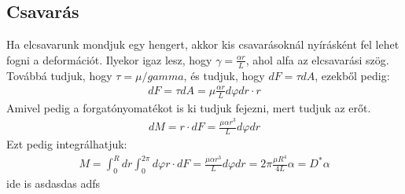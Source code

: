 \documentclass{article}
\begin{document}
\subsection{Csavarás}
Ha elcsavarunk mondjuk egy hengert, akkor kis csavarásoknál nyírásként fel lehet fogni a deformációt. Ilyekor igaz lesz, hogy $\gamma = \frac{\alpha r}{L}$, ahol alfa az elcsavarási szög. Továbbá tudjuk, hogy $\tau = \mu / gamma$, és tudjuk, hogy $dF = \tau dA$, ezekből pedig:
\begin{align*}
dF = \tau dA = \mu \frac{\alpha r}{L} d\varphi dr \cdot r
\end{align*}
Amivel pedig a forgatónyomatékot is ki tudjuk fejezni, mert tudjuk az erőt.
\begin{align*}
dM = r \cdot dF = \frac{\mu \alpha r^3}{L }d\varphi dr
\end{align*}
Ezt pedig integrálhatjuk:
\begin{align*}
M=\int_0^R dr \int_0^{2\pi} d\varphi r \cdot dF = \frac{\mu \alpha r^3}{L }d\varphi dr = 2\pi \frac{\mu R^4}{4L} \alpha = D^* \alpha
\end{align*}
\newpage
ide is
asdasdas
adfs
\newpage
\end{document}
